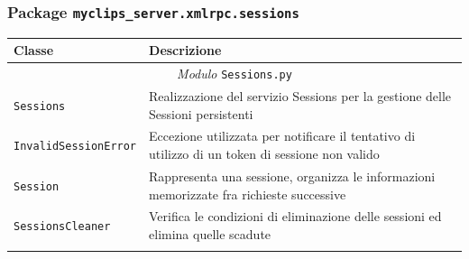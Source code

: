 \subsubsection{Package \texttt{myclips\_server.xmlrpc.sessions}}

\begin{longtable}{p{5.5cm}p{6.5cm}}
\hline 
\textbf{Classe} & \textbf{Descrizione} \\ 
\hline\hline 
\endhead

\multicolumn{2}{c}{\emph{Modulo} \texttt{Sessions.py}}\\
	\hdashline[5pt/5pt]
		\texttt{Sessions} & Realizzazione del servizio Sessions per la gestione delle Sessioni persistenti \\ 
	\hdashline[1pt/5pt]
		\texttt{InvalidSessionError} & Eccezione utilizzata per notificare il tentativo di utilizzo di un token di sessione non valido\\ 
	\hdashline[1pt/5pt]
		\texttt{Session} & Rappresenta una sessione, organizza le informazioni memorizzate fra richieste successive\\ 
	\hdashline[1pt/5pt]
		\texttt{SessionsCleaner} & Verifica le condizioni di eliminazione delle sessioni ed elimina quelle scadute\\ 
	\hline\\


\end{longtable}

